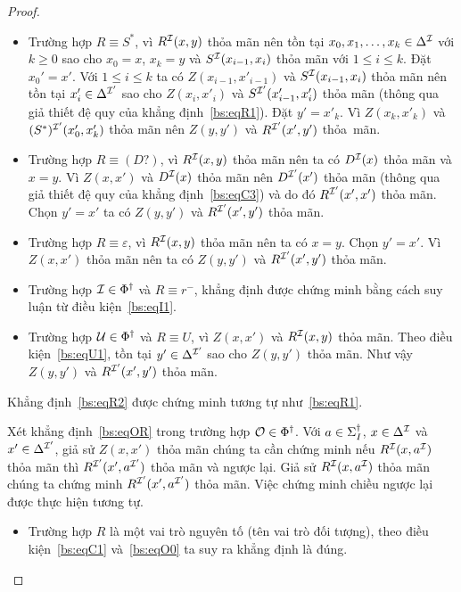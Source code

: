 \begin{proof}
\begin{itemize}
		\item Trường hợp $R \equiv S^*$, vì $R^{\mathcal{I}}(x,y)$ thỏa mãn nên tồn tại $x_0, x_1, \ldots, x_k \in \Delta^{\mathcal{I}}$ với $k \geq 0$ sao cho $x_0 = x$, $x_k = y$ và $S^{\mathcal{I}}(x_{i-1}, x_i)$ thỏa mãn với $1 \leq i \leq k$. Đặt $x_0' = x'$. Với $1 \leq i \leq k$ ta có $Z(x_{i-1}, x'_{i-1})$ và $S^{\mathcal{I}}(x_{i-1}, x_i)$ thỏa mãn nên tồn tại $x'_i \in \Delta^{\mathcal{I}'}$ sao cho $Z(x_i, x'_i)$ và $S^{\mathcal{I}'}(x'_{i-1}, x'_i)$ thỏa mãn (thông qua giả thiết đệ quy của khẳng định~\eqref{bs:eqR1}). Đặt $y'=x'_k$. Vì $Z(x_k,x'_k)$ và $(S^*)^{\mathcal{I}'}(x'_0, x'_k)$ thỏa mãn nên $Z(y,y')$ và $R^{\mathcal{I}'}(x',y')$ thỏa~mãn.
		
		\item Trường hợp $R \equiv (D?)$, vì $R^{\mathcal{I}}(x,y)$ thỏa mãn nên ta có $D^{\mathcal{I}}(x)$ thỏa mãn và $x=y$. Vì $Z(x,x')$ và $D^{\mathcal{I}}(x)$ thỏa mãn nên $D^{\mathcal{I}'}(x')$ thỏa mãn (thông qua giả thiết đệ quy của khẳng định~\eqref{bs:eqC3}) và do đó $R^{\mathcal{I}'}(x',x')$ thỏa mãn. Chọn $y' = x'$ ta có $Z(y,y')$ và $R^{\mathcal{I}'}(x',y')$ thỏa mãn.
		
		\item Trường hợp $R \equiv \varepsilon$, vì $R^{\mathcal{I}}(x,y)$ thỏa mãn nên ta có $x=y$. Chọn $y' = x'$. Vì $Z(x,x')$ thỏa mãn nên ta có $Z(y,y')$ và $R^{\mathcal{I}'}(x',y')$ thỏa mãn.
		
		\item Trường hợp $\mathcal{I} \in \Phi^\dag$ và $R \equiv r^-$, khẳng định được chứng minh bằng cách suy luận từ điều kiện~\eqref{bs:eqI1}.
		
		\item Trường hợp $\mathcal{U} \in \Phi^\dag$ và $R \equiv U$, vì $Z(x, x')$ và $R^{\mathcal{I}}(x,y)$ thỏa mãn. Theo điều kiện~\eqref{bs:eqU1}, tồn tại $y' \in \Delta^{\mathcal{I}'}$ sao cho $Z(y,y')$ thỏa mãn. Như vậy $Z(y,y')$ và $R^{\mathcal{I}'}(x',y')$ thỏa mãn.
	\end{itemize}
	
	\semiItem Khẳng định~\eqref{bs:eqR2} được chứng minh tương tự như~\eqref{bs:eqR1}.
	
	\semiItem Xét khẳng định~\eqref{bs:eqOR} trong trường hợp $\mathcal{O} \in \Phi^\dag$. Với $a \in \Sigma^\dag_I$, $x \in \Delta^{\mathcal{I}}$ và $x' \in \Delta^{\mathcal{I}'}$, giả sử $Z(x,x')$ thỏa mãn chúng ta cần chứng minh nếu $R^{\mathcal{I}}(x,a^{\mathcal{I}})$ thỏa mãn thì $R^{\mathcal{I}'}(x',a^{\mathcal{I}'})$ thỏa mãn và ngược lại. 
	Giả sử $R^{\mathcal{I}}(x,a^{\mathcal{I}})$ thỏa mãn chúng ta chứng minh $R^{\mathcal{I}'}(x',a^{\mathcal{I}'})$ thỏa mãn. Việc chứng minh chiều ngược lại được thực hiện tương tự.
	
	\begin{itemize}
		\item Trường hợp $R$ là một vai trò nguyên tố (tên vai trò đối tượng), theo điều kiện~\eqref{bs:eqC1} và~\eqref{bs:eqO0} ta suy ra khẳng định là đúng.
		

\end{itemize}
\end{proof}
